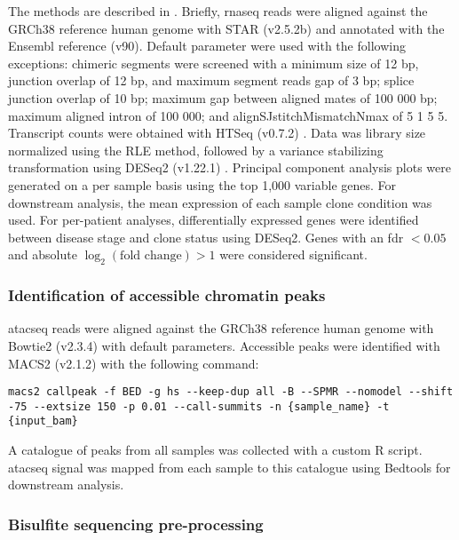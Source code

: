 The methods are described in \cite[REF][]{dobsonRelapseFatedLatentDiagnosis2020}.
Briefly, \gls{rnaseq} reads were aligned against the GRCh38 reference human genome with STAR (v2.5.2b) \cite{dobinSTARUltrafastUniversal2013} and annotated with the Ensembl reference (v90).
Default parameter were used with the following exceptions: chimeric segments were screened with a minimum size of 12 bp, junction overlap of 12 bp, and maximum segment reads gap of 3 bp; splice junction overlap of 10 bp; maximum gap between aligned mates of 100 000 bp; maximum aligned intron of 100 000; and alignSJstitchMismatchNmax of 5 1 5 5.
Transcript counts were obtained with HTSeq (v0.7.2) \cite{andersHTSeqPythonFramework2015}.
Data was library size normalized using the RLE method, followed by a variance stabilizing transformation using DESeq2 (v1.22.1) \cite{loveModeratedEstimationFold2014}.
Principal component analysis plots were generated on a per sample basis using the top 1,000 variable genes.
For downstream analysis, the mean expression of each sample clone condition was used.
For per-patient analyses, differentially expressed genes were identified between disease stage and clone status using DESeq2.
Genes with an \gls{fdr} $< 0.05$ and absolute $\log_2(\text{fold change}) > 1$ were considered significant.

\subsubsection{Identification of accessible chromatin peaks}

\Gls{atacseq} reads were aligned against the GRCh38 reference human genome with Bowtie2 (v2.3.4) \cite{langmeadFastGappedreadAlignment2012} with default parameters.
Accessible peaks were identified with MACS2 (v2.1.2) \cite{zhangModelbasedAnalysisChIPSeq2008} with the following command:

\begin{lstlisting}[basicstyle=\ttfamily]
  macs2 callpeak -f BED -g hs --keep-dup all -B --SPMR --nomodel --shift -75 --extsize 150 -p 0.01 --call-summits -n {sample_name} -t {input_bam}
\end{lstlisting}

A catalogue of peaks from all samples was collected with a custom R script.
\Gls{atacseq} signal was mapped from each sample to this catalogue using Bedtools \cite{quinlanBEDToolsSwissArmyTool2014} for downstream analysis.

\subsubsection{Bisulfite sequencing pre-processing}

